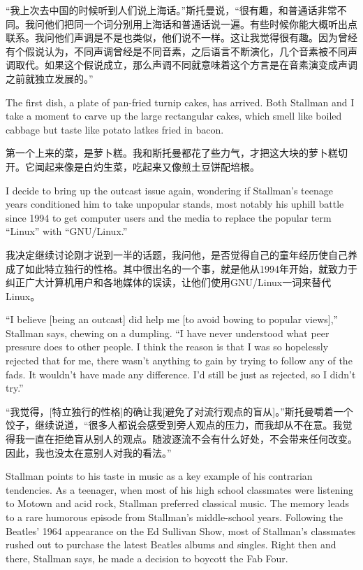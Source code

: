 \ifdefined\chs
``我上次去中国的时候听到人们说上海话。''斯托曼说，``很有趣，和普通话非常不同。我问他们把同一个词分别用上海话和普通话说一遍。有些时候你能大概听出点联系。我问他们声调是不是也类似，他们说不一样。这让我觉得很有趣。因为曾经有个假说认为，不同声调曾经是不同音素，之后语言不断演化，几个音素被不同声调取代。如果这个假说成立，那么声调不同就意味着这个方言是在音素演变成声调之前就独立发展的。''
\fi

\ifdefined\eng
The first dish, a plate of pan-fried turnip cakes, has arrived. Both Stallman and I take a moment to carve up the large rectangular cakes, which smell like boiled cabbage but taste like potato latkes fried in bacon.
\fi

\ifdefined\chs
第一个上来的菜，是萝卜糕。我和斯托曼都花了些力气，才把这大块的萝卜糕切开。它闻起来像是白灼生菜，吃起来又像煎土豆饼配培根。
\fi

\ifdefined\eng
I decide to bring up the outcast issue again, wondering if Stallman's teenage years conditioned him to take unpopular stands, most notably his uphill battle since 1994 to get computer users and the media to replace the popular term ``Linux'' with ``GNU/Linux.''
\fi

\ifdefined\chs
我决定继续讨论刚才说到一半的话题，我问他，是否觉得自己的童年经历使自己养成了如此特立独行的性格。其中很出名的一个事，就是他从1994年开始，就致力于纠正广大计算机用户和各地媒体的误读，让他们使用GNU/Linux一词来替代Linux。
\fi

\ifdefined\eng
``I believe [being an outcast] did help me [to avoid bowing to popular views],'' Stallman says, chewing on a dumpling. ``I have never understood what peer pressure does to other people. I think the reason is that I was so hopelessly rejected that for me, there wasn't anything to gain by trying to follow any of the fads. It wouldn't have made any difference. I'd still be just as rejected, so I didn't try.''
\fi

\ifdefined\chs
``我觉得，[特立独行的性格]的确让我[避免了对流行观点的盲从]。''斯托曼嚼着一个饺子，继续说道，``很多人都说会感受到旁人观点的压力，而我却从不在意。我觉得我一直在拒绝盲从别人的观点。随波逐流不会有什么好处，不会带来任何改变。因此，我也没太在意别人对我的看法。''
\fi

\ifdefined\eng
Stallman points to his taste in music as a key example of his contrarian tendencies. As a teenager, when most of his high school classmates were listening to Motown and acid rock, Stallman preferred classical music. The memory leads to a rare humorous episode from Stallman's middle-school years. Following the Beatles' 1964 appearance on the Ed Sullivan Show, most of Stallman's classmates rushed out to purchase the latest Beatles albums and singles. Right then and there, Stallman says, he made a decision to boycott the Fab Four.
\fi

